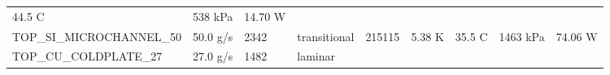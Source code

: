 \documentclass[10pt,]{article}
\begin{document}
\begin{longtable}[]{@{}lllllllll@{}}
\begin{minipage}[t]{0.08\columnwidth}
44.5 C\strut
\end{minipage} & \begin{minipage}[t]{0.08\columnwidth}\raggedright
538 kPa\strut
\end{minipage} & \begin{minipage}[t]{0.08\columnwidth}\raggedright
14.70 W\strut
\end{minipage}\tabularnewline
\begin{minipage}[t]{0.08\columnwidth}\raggedright
TOP\_SI\_MICROCHANNEL\_50\strut
\end{minipage} & \begin{minipage}[t]{0.08\columnwidth}\raggedright
50.0 g/s\strut
\end{minipage} & \begin{minipage}[t]{0.08\columnwidth}\raggedright
2342\strut
\end{minipage} & \begin{minipage}[t]{0.08\columnwidth}\raggedright
transitional\strut
\end{minipage} & \begin{minipage}[t]{0.08\columnwidth}\raggedright
215115\strut
\end{minipage} & \begin{minipage}[t]{0.08\columnwidth}\raggedright
5.38 K\strut
\end{minipage} & \begin{minipage}[t]{0.08\columnwidth}\raggedright
35.5 C\strut
\end{minipage} & \begin{minipage}[t]{0.08\columnwidth}\raggedright
1463 kPa\strut
\end{minipage} & \begin{minipage}[t]{0.08\columnwidth}\raggedright
74.06 W\strut
\end{minipage}\tabularnewline
\begin{minipage}[t]{0.08\columnwidth}\raggedright
TOP\_CU\_COLDPLATE\_27\strut
\end{minipage} & \begin{minipage}[t]{0.08\columnwidth}\raggedright
27.0 g/s\strut
\end{minipage} & \begin{minipage}[t]{0.08\columnwidth}\raggedright
1482\strut
\end{minipage} & \begin{minipage}[t]{0.08\columnwidth}\raggedright
laminar\strut
\end{minipage} & \begin{minipage}[t]{0.08\columnwidth}\raggedright

\end{minipage}
\end{longtable}
\end{document}
